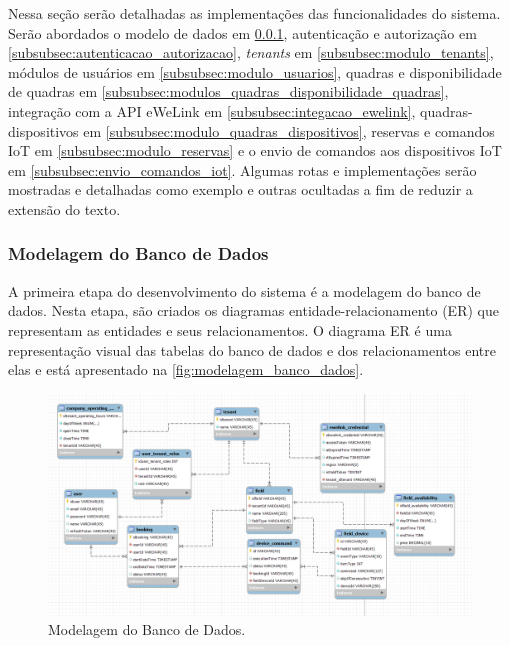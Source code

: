 Nessa seção serão detalhadas as implementações das funcionalidades do sistema. Serão abordados o modelo de dados em \ref{subsubsec:modelagem_banco_dados}, autenticação e autorização em \ref{subsubsec:autenticacao_autorizacao}, \textit{tenants} em \ref{subsubsec:modulo_tenants}, módulos de usuários em \ref{subsubsec:modulo_usuarios}, quadras e disponibilidade de quadras em \ref{subsubsec:modulos_quadras_disponibilidade_quadras}, integração com a API eWeLink em \ref{subsubsec:integacao_ewelink}, quadras-dispositivos em \ref{subsubsec:modulo_quadras_dispositivos}, reservas e comandos IoT em \ref{subsubsec:modulo_reservas} e o envio de comandos aos dispositivos IoT em \ref{subsubsec:envio_comandos_iot}. Algumas rotas e implementações serão mostradas e detalhadas como exemplo e outras ocultadas a fim de reduzir a extensão do texto.

\subsubsection{Modelagem do Banco de Dados}\label{subsubsec:modelagem_banco_dados}
A primeira etapa do desenvolvimento do sistema é a modelagem do banco de dados. Nesta etapa, são criados os diagramas entidade-relacionamento (ER) que representam as entidades e seus relacionamentos. O diagrama ER é uma representação visual das tabelas do banco de dados e dos relacionamentos entre elas e está apresentado na \autoref{fig:modelagem_banco_dados}.

\begin{figure}[htp]
	\caption{\label{fig:modelagem_banco_dados}Modelagem do Banco de Dados.}
	\begin{center}
	  \includegraphics[scale=0.38]{images/cap5/modelage_banco_dados.png}
	\end{center}
\end{figure}


